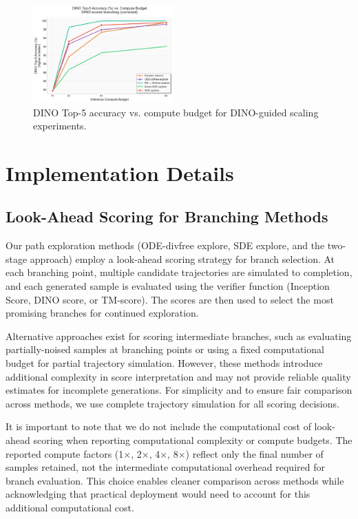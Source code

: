 \documentclass{article}
\begin{document}
\begin{figure}[H]
  \centering
  \includegraphics[width=0.48\textwidth]{figures/scaling_dino_top5.pdf}
  \caption{DINO Top-5 accuracy vs. compute budget for DINO-guided scaling experiments.}
  \label{fig:dino-scaling-complete}
\end{figure}

\section{Implementation Details}

\subsection{Look-Ahead Scoring for Branching Methods}

Our path exploration methods (ODE-divfree explore, SDE explore, and the two-stage approach) employ a look-ahead scoring strategy for branch selection. At each branching point, multiple candidate trajectories are simulated to completion, and each generated sample is evaluated using the verifier function (Inception Score, DINO score, or TM-score). The scores are then used to select the most promising branches for continued exploration.

Alternative approaches exist for scoring intermediate branches, such as evaluating partially-noised samples at branching points or using a fixed computational budget for partial trajectory simulation. However, these methods introduce additional complexity in score interpretation and may not provide reliable quality estimates for incomplete generations. For simplicity and to ensure fair comparison across methods, we use complete trajectory simulation for all scoring decisions.

It is important to note that we do not include the computational cost of look-ahead scoring when reporting computational complexity or compute budgets. The reported compute factors (1×, 2×, 4×, 8×) reflect only the final number of samples retained, not the intermediate computational overhead required for branch evaluation. This choice enables cleaner comparison across methods while acknowledging that practical deployment would need to account for this additional computational cost.
\end{document}
